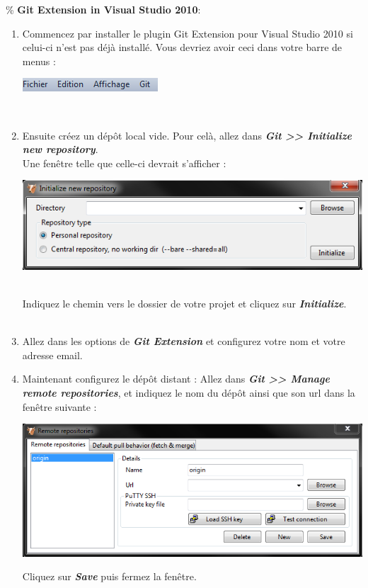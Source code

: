 \documentclass[a4paper]{article}
\begin{document}
\% \textbf{Git Extension in Visual Studio 2010}:\\
\begin{enumerate}
    \item Commencez par installer le plugin Git Extension pour Visual Studio 2010 si
celui-ci n'est pas d\'ejà install\'e. Vous devriez avoir ceci dans votre barre
de menus :
\begin{center}
    \includegraphics{img/VS_git.png}
\end{center}
\\
    \item Ensuite cr\'eez un d\'epôt local vide. Pour celà, allez dans
	\textbf{\emph{Git
	>> Initialize new repository}}. \\
Une fenêtre telle que celle-ci devrait s'afficher :\\
\begin{center}
    \includegraphics{img/VS_new_repo.png}\\ 
\end{center}
\\
Indiquez le chemin vers le dossier de votre projet et cliquez sur
\textbf{\emph{Initialize}}.\\
\\
    \item Allez dans les options de \textbf{\emph{Git Extension}} et
	configurez votre nom et votre adresse email.
	\\
    \item Maintenant configurez le d\'epôt distant : Allez dans \textbf{\emph{Git >>
	Manage remote repositories}}, et indiquez le nom du d\'epôt ainsi que
	son url dans la fenêtre suivante : \\
    \begin{center}
	\includegraphics[scale=0.85]{img/VS_manage_remote.png} \\
    \end{center}
    Cliquez sur \textbf{\emph{Save}} puis fermez la fenêtre. \\
    \\
 

\end{enumerate}
\end{document}
